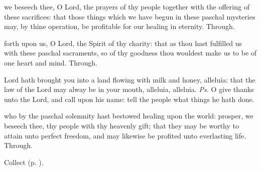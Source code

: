 
\secret\label{EasterSecret}
 we beseech thee, O Lord, the prayers of thy people together with the offering of these sacrifices: that those things which we have begun in these paschal mysteries may, by thine operation, be profitable for our healing in eternity. Through.


\postcommunion\label{EasterPostcommunion}
 forth upon us, O Lord, the Spirit of thy charity: that as thou hast fulfilled us with these paschal sacraments, so of thy goodness thou wouldest make us to be of one heart and mind. Through.




\introit
{} Lord hath brought you into a land flowing with milk and honey, alleluia: that the law of the Lord may alway be in your mouth, alleluia, alleluia. \textit{Ps.} O give thanks unto the Lord, and call upon his name: tell the people what things he hath done.

\collect
 who by the paschal solemnity hast bestowed healing upon the world: prosper, we beseech thee, thy people with thy heavenly gift; that they may be worthy to attain unto perfect freedom, and may likewise be profited unto everlasting life. Through.
\begin{rubric}
     Collect  (p. \pageref{EasterCollect}).
\end{rubric}

